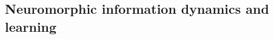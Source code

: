 \documentclass[fleqn,10pt,  amsmath,amssymb,aps]{wlscirep}
\begin{document}





\subsection*{Neuromorphic information dynamics and learning}
\end{document}
